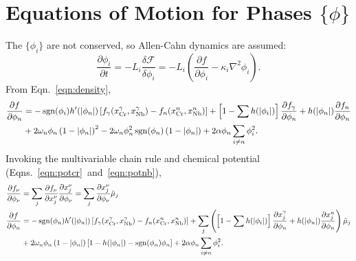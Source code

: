 \documentclass[10pt]{article}
\DeclareMathOperator{\sgn}{sgn}
\begin{document}
	\section{Equations of Motion for Phases $\{\phi\}$}
		The $\{\phi_i\}$ are not conserved, so Allen-Cahn dynamics are assumed:
		\begin{equation}
			\frac{\partial \phi_i}{\partial t} = -L_i\frac{\delta\mathcal{F}}{\delta\phi_i} = -L_i\left(\frac{\partial f}{\partial \phi_i} - \kappa_i\nabla^2\phi_i\right).
		\end{equation}
		From Eqn.~\ref{eqn:density},
		\begin{align}\nonumber
			\frac{\partial f}{\partial \phi_n} &= -\sgn(\phi_i)h'(|\phi_n|)\left[f_{\gamma}(x_{\ce{Cr}}^{\gamma},x_{\ce{Nb}}^{\gamma}) - f_n(x_{\ce{Cr}}^n,x_{\ce{Nb}}^n)\right]
			                                    + \left[1 - \sum h(|\phi_i|)\right] \frac{\partial f_{\gamma}}{\partial \phi_n}
			                                    + h(|\phi_n|)\frac{\partial f_n}{\partial \phi_n}\\
			                                   &+ 2\omega_n\phi_n\left(1-|\phi_n|\right)^2 - 2\omega_n\phi_n^2\sgn(\phi_n)\left(1-|\phi_n|\right)
			                                    + 2\alpha\phi_n\sum_{i\neq n}\phi_i^2.
		\end{align}
		Invoking the multivariable chain rule and chemical potential (Eqns.~\ref{eqn:potcr}~and~\ref{eqn:potnb}),
		\begin{align}\nonumber
			\frac{\partial f_{\nu}}{\partial \phi_{\nu}} &= \sum_j \frac{\partial f_{\nu}}{\partial x_j^{\nu}}\frac{\partial x_j^{\nu}}{\partial \phi_{\nu}}
			                                         = \sum_j\frac{\partial x_j^{\nu}}{\partial \phi_{\nu}}\tilde{\mu}_j\\
			\nonumber
			\frac{\partial f}{\partial \phi_n} &= -\sgn(\phi_n)h'(|\phi_n|)\left[f_{\gamma}(x_{\ce{Cr}}^{\gamma},x_{\ce{Nb}}^{\gamma}) - f_n(x_{\ce{Cr}}^n,x_{\ce{Nb}}^n)\right]
			                                    + \sum_j\left(\left[1 - \sum h(|\phi_i|)\right] \frac{\partial x_j^{\gamma}}{\partial \phi_n}
			                                    + h(|\phi_n|)\frac{\partial x_j^n}{\partial \phi_n}\right)\tilde{\mu}_j\\
			                                   &+ 2\omega_n\phi_n\left(1-|\phi_n|\right)\left[1 - h(|\phi_n|) - \sgn(\phi_n)\phi_n\right]
			                                    + 2\alpha\phi_n\sum_{i\neq n}\phi_i^2.\label{eqn:potentphi}
		\end{align}
\end{document}
